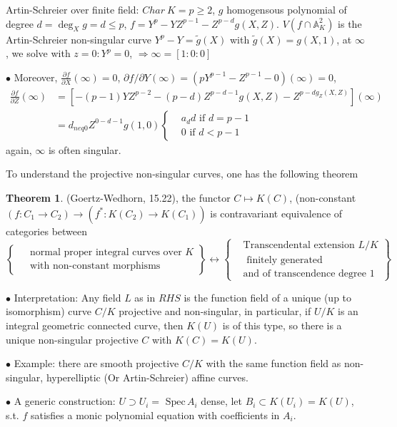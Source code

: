 \documentclass[11pt]{article}
\theoremstyle{definition}
\newtheorem{thm}{Theorem}[section]
\newcommand{\spec}{\text{ Spec}\,}
\newcommand{\affn}{\mathbb A}
\newcommand{\pd}{\partial}
\newcommand{\Lrta}{\Longrightarrow}
\newcommand{\lrta}{\longrightarrow}
\newcommand{\llrta}{\longleftrightarrow}
\begin{document}
Artin-Schreier over finite field: $Char\  K=p\geq 2$, $g$ homogensous polynomial of degree $d=\deg_X g=d\leq p$, $f=Y^p-YZ^{p-1}-Z^{p-d}g(X,Z)$.
$V(f\cap \affn^2_K)$ is the Artin-Schreier non-singular curve $Y^p-Y=\tilde{g}(X)$ with $\tilde{g}(X)=g(X,1)$, at $\infty$, we solve with $z=0:Y^p=0$, $\Lrta \infty=[1:0:0]$

$\bullet$ Moreover, $\frac{\pd f}{\pd X}(\infty)=0$, $\pd f/\pd Y(\infty)=(pY^{p-1}-Z^{p-1}-0)(\infty)=0$, 
$$
\begin{aligned}
\frac{\pd f}{\pd Z}(\infty)
&=[-(p-1)YZ^{p-2}-(p-d)Z^{p-d-1}g(X,Z)-Z^{p-dg_Z(X,Z)}](\infty)\\
&= d_{neq 0} Z^{0-d-1} g(1,0)\left\{\begin{aligned}
&a_d d \text{ if } d=p-1\\
&0\text{ if } d< p-1
\end{aligned}\right.
\end{aligned}
$$
again, $\infty$ is often singular.

To understand the projective non-singular curves, one has the following theorem
\begin{thm}
(Goertz-Wedhorn, 15.22), the functor
$C\mapsto K(C)$, (non-constant $(f:C_1\lrta C_2)\lrta (f^*:K(C_2)\lrta K(C_1))$ is contravariant equivalence of categories between
$$
\left\{\begin{aligned}
&\text{ normal proper integral curves over $K$}\\
&\text{ with non-constant morphisms}
\end{aligned}\right\}
\llrta 
\left\{\begin{aligned}
&\text{Transcendental extension $L/K$}\\
&\text{ finitely generated}\\ 
&\text{and of transcendence degree $1$}
\end{aligned}\right\}
$$
\end{thm}
$\bullet$ Interpretation: Any field $L$ as in $RHS$ is the function field of a unique (up  to isomorphism) curve $C/K$ projective and non-singular, in particular, if $U/K$ is an integral geometric connected curve, then $K(U)$ is of this type, so there is a unique non-singular projective $C$ with $K(C)=K(U)$.

$\bullet$ Example: there are smooth projective $C/K$ with the same function field as non-singular, hyperelliptic (Or Artin-Schreier) affine curves.

$\bullet$ A generic construction:
$U\supset U_i =\spec A_i$ dense, let $B_i\subset K(U_i)=K(U)$, s.t. $f$ satisfies a monic polynomial equation with coefficients in $A_i$.
\end{document}
